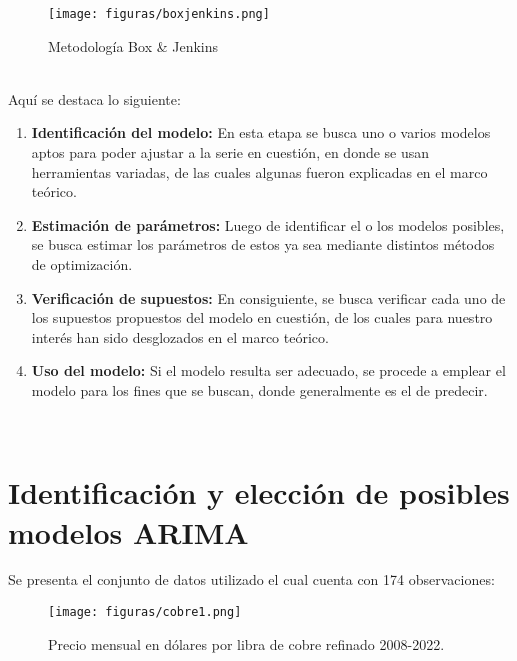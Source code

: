 \documentclass{report}
\begin{document}
\begin{figure}[htp]
        \centering
    	\texttt{[image: figuras/boxjenkins.png]}
    	\caption{Metodología Box \& Jenkins}
    	\label{fig: Figura1}
    \end{figure}\\
    
Aquí se destaca lo siguiente:\\
\begin{enumerate}
    \item \textbf{Identificación del modelo:} En esta etapa se busca uno o varios modelos aptos para poder ajustar a la serie en cuestión, en donde se usan herramientas variadas, de las cuales algunas fueron explicadas en el marco teórico.
    \item \textbf{Estimación de parámetros:} Luego de identificar el o los modelos posibles, se busca estimar los parámetros de estos ya sea mediante distintos métodos de optimización.
    \item \textbf{Verificación de supuestos:} En consiguiente, se busca verificar cada uno de los supuestos propuestos del modelo en cuestión, de los cuales para nuestro interés han sido desglozados en el marco teórico.
    \item \textbf{Uso del modelo:} Si el modelo resulta ser adecuado, se procede a emplear el modelo para los fines que se buscan, donde generalmente es el de predecir.
\end{enumerate}\\

\section{Identificación y elección de posibles modelos ARIMA}\label{Elección}
Se presenta el conjunto de datos utilizado el cual cuenta con 174 observaciones:
\\
    \begin{figure}[htp]
        \centering
    	\texttt{[image: figuras/cobre1.png]}
    	\caption{Precio mensual en dólares por libra de cobre refinado 2008-2022.}
    	\label{fig: Figura1}
    \end{figure}\\
    
\end{document}
